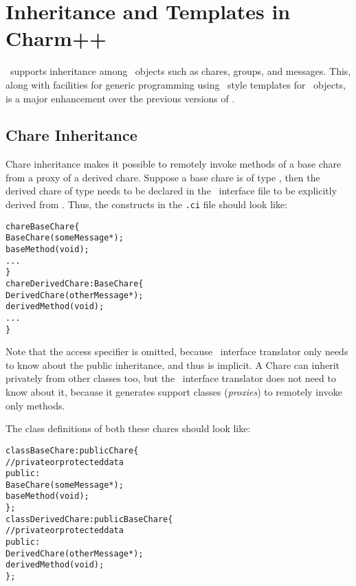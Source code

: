 \chapter{Inheritance and Templates in Charm++}
\label{inheritance and templates}

\charmpp\ supports inheritance among \charmpp\ objects such as
chares, groups, and messages. This, along with facilities for generic
programming using \CC\ style templates for \charmpp\ objects, is a
major enhancement over the previous versions of \charmpp.

\section{Chare Inheritance}

Chare inheritance makes it possible to remotely invoke methods of a base
chare  from a proxy of a derived
chare. Suppose a base chare is of type 
, then the derived chare of type  needs to be
declared in the \charmpp\ interface file to be explicitly derived from
. Thus, the constructs in the \texttt{.ci} file should look like:

\begin{alltt}
  chare BaseChare \{
    BaseChare(someMessage *);
    baseMethod(void);
    ...
  \}
  chare DerivedChare : BaseChare \{
    DerivedChare(otherMessage *);
    derivedMethod(void);
    ...
  \}
\end{alltt}

Note that the access specifier  is omitted, because \charmpp\
interface translator only needs to know about the public inheritance,
and thus \kw{public} is implicit. A Chare can inherit privately from other
classes too, but the \charmpp\ interface translator does not need to know
about it, because it generates support classes ({\em proxies}) to remotely
invoke only \kw{public} methods.

The class definitions of both these chares should look like:

\begin{alltt}
  class BaseChare : public Chare \{
    // private or protected data
    public:
      BaseChare(someMessage *);
      baseMethod(void);
  \};
  class DerivedChare : public BaseChare \{
    // private or protected data
    public:
      DerivedChare(otherMessage *);
      derivedMethod(void);
  \};
\end{alltt}

